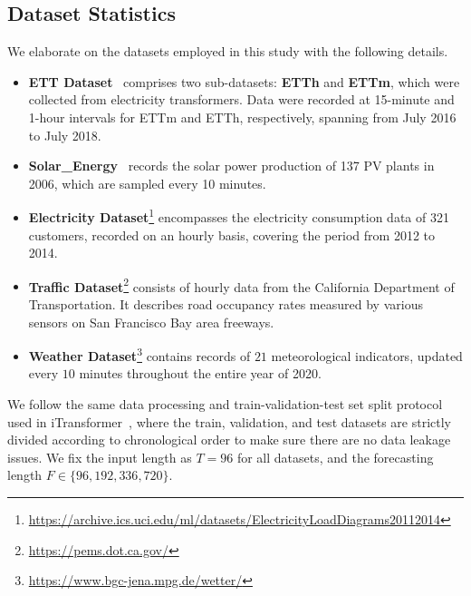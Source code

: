 \subsection{Dataset Statistics}
\label{app:datasets details}
We elaborate on the datasets employed in this study with the following details.

\begin{itemize}
    \item \textbf{ETT Dataset}~\citep{Zhou2020informer} comprises two sub-datasets: \textbf{ETTh} and \textbf{ETTm}, which were collected from electricity transformers. Data were recorded at 15-minute and 1-hour intervals for ETTm and ETTh, respectively, spanning from July 2016 to July 2018.

    \item \textbf{Solar\_Energy}~\citep{Lai2018lstnet} records the solar power production of 137 PV plants in 2006, which are sampled every 10 minutes.

    \item \textbf{Electricity Dataset}\footnote{\url{https://archive.ics.uci.edu/ml/datasets/ElectricityLoadDiagrams20112014}} encompasses the electricity consumption data of 321 customers, recorded on an hourly basis, covering the period from 2012 to 2014. 

    \item \textbf{Traffic Dataset}\footnote{\url{https://pems.dot.ca.gov/}} consists of hourly data from the California Department of Transportation. It describes road occupancy rates measured by various sensors on San Francisco Bay area freeways. 

    \item \textbf{Weather Dataset}\footnote{\url{https://www.bgc-jena.mpg.de/wetter/}} contains records of $21$ meteorological indicators, updated every $10$ minutes throughout the entire year of 2020. 

\end{itemize}
We follow the same data processing and train-validation-test set split protocol used in iTransformer~\citep{LiuiTransformer}, where the train, validation, and test datasets are strictly divided according to chronological order to make sure there are no data leakage issues. We fix the input length as $T = 96$ for all datasets, and the forecasting length $F \in \{96, 192, 336, 720\}$.

